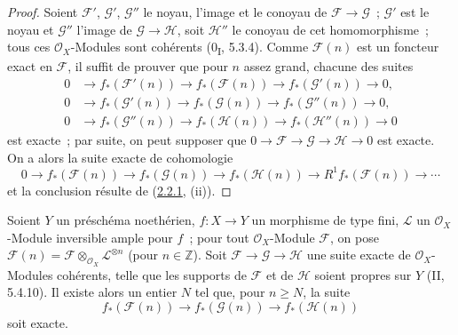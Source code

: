 \begin{proof}
Soient $\mathcal F'$, $\mathcal G'$, $\mathcal G''$ le noyau, l'image et
le conoyau de $\mathcal F\to\mathcal G$~; $\mathcal G'$ est le noyau et
$\mathcal G''$ l'image de $\mathcal G\to\mathcal H$, soit $\mathcal H''$
le conoyau de cet homomorphisme~; tous ces $\mathcal O_X$-Modules sont
cohérents (0\textsubscript{I}, 5.3.4). Comme $\mathcal F(n)$ est un
foncteur exact en $\mathcal F$, il suffit de prouver que pour $n$ assez
grand, chacune des suites
\begin{align*}
0&\longrightarrow f_*(\mathcal F'(n))
\longrightarrow f_*(\mathcal F(n))
\longrightarrow f_*(\mathcal G'(n))\longrightarrow0,\\
0&\longrightarrow f_*(\mathcal G'(n))
\longrightarrow f_*(\mathcal G(n))
\longrightarrow f_*(\mathcal G''(n))\longrightarrow0,\\
0&\longrightarrow f_*(\mathcal G''(n))
\longrightarrow f_*(\mathcal H(n))
\longrightarrow f_*(\mathcal H''(n))\longrightarrow0
\end{align*}
est exacte~; par suite, on peut supposer que
$0\to\mathcal F\to\mathcal G\to\mathcal H\to0$ est exacte. On a alors
la suite exacte de cohomologie
\[
0\longrightarrow f_*(\mathcal F(n))
\longrightarrow f_*(\mathcal G(n))
\longrightarrow f_*(\mathcal H(n))
\longrightarrow R^1f_*(\mathcal F(n))\longrightarrow\cdots
\]
et la conclusion résulte de (\hyperref[III.2.2.1-fr]{2.2.1}, (ii)).
\end{proof}

\begin{corollary}[2.2.4]
\label{III.2.2.4-fr}
Soient $Y$ un préschéma noethérien, $f:X\to Y$ un morphisme de type fini,
$\mathcal L$ un $\mathcal O_X$-Module inversible ample pour $f$~; pour
tout $\mathcal O_X$-Module $\mathcal F$, on pose
$\mathcal F(n)=\mathcal F\otimes_{\mathcal O_X}\mathcal L^{\otimes n}$
(pour $n\in\mathbb Z$). Soit
$\mathcal F\to\mathcal G\to\mathcal H$ une suite exacte de
$\mathcal O_X$-Modules cohérents, telle que les supports de $\mathcal F$
et de $\mathcal H$ soient propres sur $Y$ (II, 5.4.10). Il existe alors
un entier $N$ tel que, pour $n\geq N$, la suite
\[
f_*(\mathcal F(n))\longrightarrow f_*(\mathcal G(n))
\longrightarrow f_*(\mathcal H(n))
\]
soit exacte.
\end{corollary}

